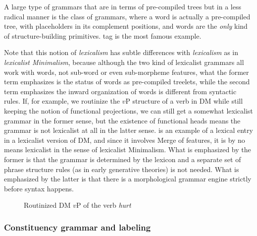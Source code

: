 \documentclass[../main.tex]{subfiles}
\begin{document}
A large type of grammars that are in terms of pre-compiled trees but in a less radical manner
is the class of  grammars, where 
a word is actually a pre-compiled tree, with placeholders in its complement positions, and words 
are the \emph{only} kind of structure-building primitives. 
\ac{tag} is the most famous example.

Note that this notion of \emph{lexicalism} has subtle differences 
with \emph{lexicalism} as in \emph{lexicalist Minimalism}, 
because although the two kind of lexicalist grammars all work with words, 
not sub-word or even sub-morpheme features, 
what the former term emphasizes is the status of words as pre-compiled treelets, 
while the second term emphasizes the inward organization of words is different from syntactic rules. 
If, for example, we routinize the $v$P structure of a verb in DM
while still keeping the notion of functional projections, 
we can still get a somewhat lexicalist grammar in the former sense, 
but the existence of functional heads means the grammar is not lexicalist at all in the latter sense.
 is an example of a lexical entry in a lexicalist version of DM, 
and since it involves Merge of features, it is by no means lexicalist in the sense of lexicalist Minimalism.
What is emphasized by the former  is that the grammar is determined by the lexicon 
and a separate set of phrase structure rules (as in early generative theories)
is not needed.
What is emphasized by the latter  is that there is a morphological grammar engine 
strictly before syntax happens.

\begin{figure}
    \centering
    
    \caption{Routinized DM $v$P of the verb \emph{hurt}}
    \label{fig:hurt-dm-routine}
\end{figure}


\subsubsection{Constituency grammar and labeling}\label{sec:phrase-label}
\end{document}
